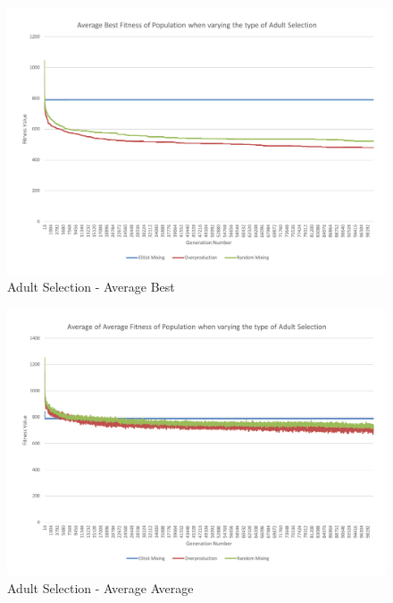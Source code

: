 \begin{figure}[thbp]
	\centerline{\includegraphics[width=\paperwidth]{figures/CircleTests/AdultSelection/CircleTestAdultSelectionAverageBest.pdf}}
	\caption{Adult Selection - Average Best}
	\label{fig:ctasab}
\end{figure}

\begin{figure}[thbp]
	\centerline{\includegraphics[width=\paperwidth]{figures/CircleTests/AdultSelection/CircleTestAdultSelectionAverageAverage.pdf}}
	\caption{Adult Selection - Average Average}
	\label{fig:ctasaa}
\end{figure}

